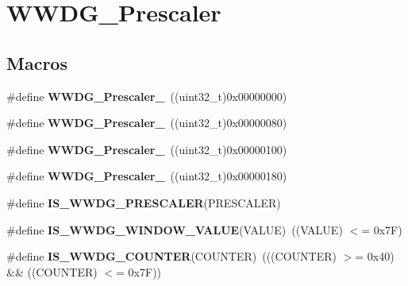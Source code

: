 \hypertarget{group___w_w_d_g___prescaler}{}\section{W\+W\+D\+G\+\_\+\+Prescaler}
\label{group___w_w_d_g___prescaler}
\subsection*{Macros}
\begin{DoxyCompactItemize}
\item 
\hypertarget{group___w_w_d_g___prescaler_ga55780dcf60a252724f5aae2ca37d91c5}{}\#define {\bfseries W\+W\+D\+G\+\_\+\+Prescaler\+\_}~((uint32\+\_\+t)0x00000000)\label{group___w_w_d_g___prescaler_ga55780dcf60a252724f5aae2ca37d91c5}

\item 
\hypertarget{group___w_w_d_g___prescaler_ga2ac67d0a7f8691b5ebf0d7d77d6b5f08}{}\#define {\bfseries W\+W\+D\+G\+\_\+\+Prescaler\+\_}~((uint32\+\_\+t)0x00000080)\label{group___w_w_d_g___prescaler_ga2ac67d0a7f8691b5ebf0d7d77d6b5f08}

\item 
\hypertarget{group___w_w_d_g___prescaler_gab11714e1816967802a8421587e54a2eb}{}\#define {\bfseries W\+W\+D\+G\+\_\+\+Prescaler\+\_}~((uint32\+\_\+t)0x00000100)\label{group___w_w_d_g___prescaler_gab11714e1816967802a8421587e54a2eb}

\item 
\hypertarget{group___w_w_d_g___prescaler_ga7a4933366603869726bd5ea547d99f02}{}\#define {\bfseries W\+W\+D\+G\+\_\+\+Prescaler\+\_}~((uint32\+\_\+t)0x00000180)\label{group___w_w_d_g___prescaler_ga7a4933366603869726bd5ea547d99f02}

\item 
\#define {\bfseries I\+S\+\_\+\+W\+W\+D\+G\+\_\+\+P\+R\+E\+S\+C\+A\+L\+E\+R}(P\+R\+E\+S\+C\+A\+L\+E\+R)
\item 
\hypertarget{group___w_w_d_g___prescaler_gab6ea714a2380b7d6547ba97363887868}{}\#define {\bfseries I\+S\+\_\+\+W\+W\+D\+G\+\_\+\+W\+I\+N\+D\+O\+W\+\_\+\+V\+A\+L\+U\+E}(V\+A\+L\+U\+E)~((V\+A\+L\+U\+E) $<$= 0x7\+F)\label{group___w_w_d_g___prescaler_gab6ea714a2380b7d6547ba97363887868}

\item 
\hypertarget{group___w_w_d_g___prescaler_ga4728877128cd60494692d8f14389112e}{}\#define {\bfseries I\+S\+\_\+\+W\+W\+D\+G\+\_\+\+C\+O\+U\+N\+T\+E\+R}(C\+O\+U\+N\+T\+E\+R)~(((C\+O\+U\+N\+T\+E\+R) $>$= 0x40) \&\& ((\+C\+O\+U\+N\+T\+E\+R) $<$= 0x7\+F))\label{group___w_w_d_g___prescaler_ga4728877128cd60494692d8f14389112e}

\end{DoxyCompactItemize}


